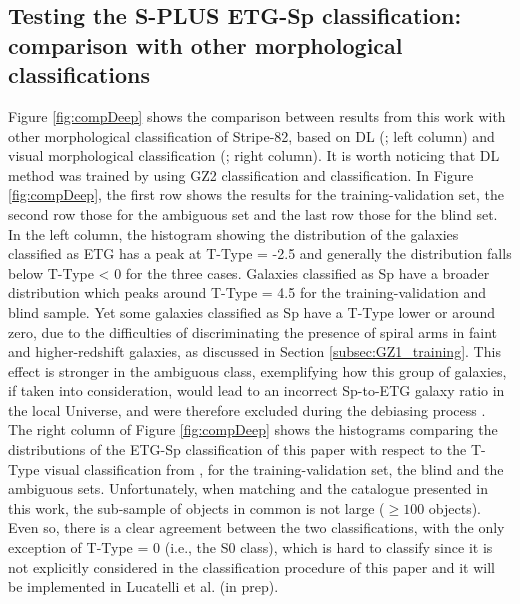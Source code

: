 \documentclass[fleqn,usenatbib]{mnras}
\begin{document}
\subsection{Testing the S-PLUS ETG-Sp classification: comparison with other morphological classifications}
\label{subsec:results_morpho}

Figure \ref{fig:compDeep} shows the comparison between results from this work with other morphological classification of Stripe-82, based on DL (\citealp{Dominguez2018}; left column) and visual morphological classification (\citealp{Nair2010}; right column). It is worth noticing that \citet{Dominguez2018} DL method was trained by using GZ2 classification and \citet{Nair2010} classification.
In Figure \ref{fig:compDeep}, the first row shows the results for the training-validation set, the second row those for the ambiguous set and the last row those for the blind set. In the left column, the histogram showing the distribution of the galaxies classified as ETG has a peak at T-Type = -2.5 and generally the distribution falls below T-Type < 0 for the three cases. Galaxies classified as Sp have a broader distribution which peaks around T-Type = 4.5 for the training-validation and blind sample. Yet some galaxies classified as Sp have a T-Type lower or around zero, due to the difficulties of discriminating the presence of spiral arms in faint and higher-redshift galaxies, as discussed in Section \ref{subsec:GZ1_training}. This effect is stronger in the ambiguous class, exemplifying how this group of galaxies, if taken into consideration, would lead to an incorrect Sp-to-ETG galaxy ratio in the local Universe, and were therefore excluded during the debiasing process \citep{bamford2009galaxy}. The right column of Figure \ref{fig:compDeep} shows the histograms comparing the distributions of the ETG-Sp classification of this paper with respect to the T-Type visual classification from \cite{Nair2010}, for the training-validation set, the blind and the ambiguous sets. Unfortunately, when matching \cite{Nair2010} and the catalogue presented in this work, the sub-sample of objects in common is not large ($\ge 100$ objects). Even so, there is a clear agreement between the two classifications, with the only exception of  T-Type = 0 (i.e., the S0 class), which is hard to classify since it is not explicitly considered in the classification procedure of this paper and it will be implemented in Lucatelli et al. (in prep).
\end{document}
